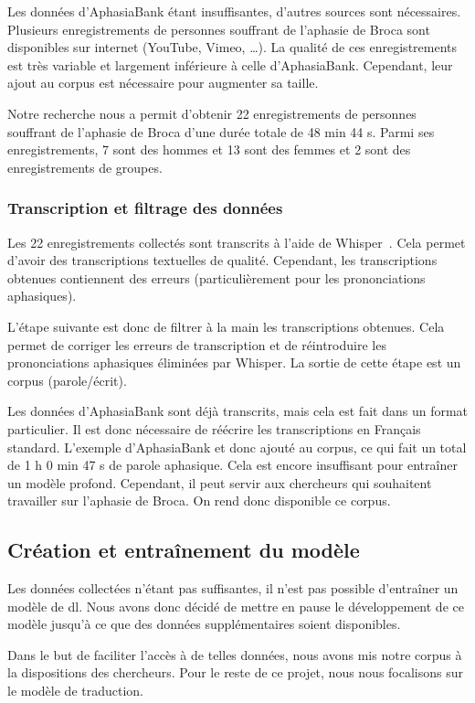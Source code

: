 Les données d'AphasiaBank étant insuffisantes, d'autres sources sont nécessaires.
Plusieurs enregistrements de personnes souffrant de l'aphasie de Broca sont disponibles sur internet 
(YouTube, Vimeo, \dots ).
La qualité de ces enregistrements est très variable et largement inférieure à celle d'AphasiaBank.
Cependant, leur ajout au corpus est nécessaire pour augmenter sa taille.

Notre recherche nous a permit d'obtenir 22 enregistrements de personnes souffrant de l'aphasie de Broca 
d'une durée totale de 48 min 44 s.
Parmi ses enregistrements, 7 sont des hommes et 13 sont des femmes et 2 sont des enregistrements de groupes.

\subsubsection{Transcription et filtrage des données}

Les 22 enregistrements collectés sont transcrits à l'aide de 
Whisper~\cite{Radford_Kim_Xu_Brockman_McLeavey_Sutskever_2022}.
Cela permet d'avoir des transcriptions textuelles de qualité.
Cependant, les transcriptions obtenues contiennent des erreurs (particulièrement pour les prononciations aphasiques).

L'étape suivante est donc de filtrer à la main les transcriptions obtenues.
Cela permet de corriger les erreurs de transcription 
et de réintroduire les prononciations aphasiques éliminées par Whisper.
La sortie de cette étape est un corpus (parole/écrit).

Les données d'AphasiaBank sont déjà transcrits, mais cela est fait dans un format particulier.
Il est donc nécessaire de réécrire les transcriptions en Français standard.
L'exemple d'AphasiaBank et donc ajouté au corpus, ce qui fait un total de 1 h 0 min 47 s de parole aphasique.
Cela est encore insuffisant pour entraîner un modèle profond.
Cependant, il peut servir aux chercheurs qui souhaitent travailler sur l'aphasie de Broca.
On rend donc disponible ce corpus.

\subsection{Création et entraînement du modèle}

Les données collectées n'étant pas suffisantes,
il n'est pas possible d'entraîner un modèle de \gls{dl}.
Nous avons donc décidé de mettre en pause le développement de ce modèle 
jusqu'à ce que des données supplémentaires soient disponibles.

Dans le but de faciliter l'accès à de telles données,
nous avons mis notre corpus à la dispositions des chercheurs.
Pour le reste de ce projet,
nous nous focalisons sur le modèle de traduction.
